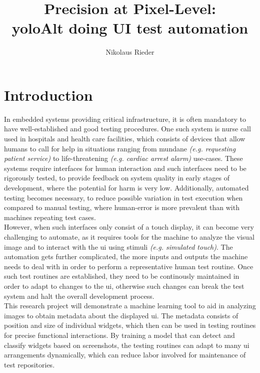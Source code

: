 \documentclass[Bachelor, BIC, english, fhCitStyle, IEEE]{BASE/twbook} %
\title{Precision at Pixel-Level:\\\acl{yoloAlt} doing UI test automation}
\author{Nikolaus Rieder}
\begin{document}
\maketitle
\chapter{Introduction}
In embedded systems providing critical infrastructure, it is often mandatory to have well-established and good testing procedures. One such system is nurse call used in hospitals and health care facilities, which consists of devices that allow humans to call for help in situations ranging from mundane \textit{(e.g. requesting patient service)} to life-threatening \textit{(e.g. cardiac arrest alarm)} use-cases. These systems require interfaces for human interaction and such interfaces need to be rigorously tested, to provide feedback on system quality in early stages of development, where the potential for harm is very low. Additionally, automated testing becomes necessary, to reduce possible variation in test execution when compared to manual testing, where human-error is more prevalent than with machines repeating test cases.\\
However, when such interfaces only consist of a touch display, it can become very challenging to automate, as it requires tools for the machine to analyze the visual image and to interact with the \ac{ui} using stimuli \textit{(e.g. simulated touch)}. The automation gets further complicated, the more inputs and outputs the machine needs to deal with in order to perform a representative human test routine. Once such test routines are established, they need to be continously maintained in order to adapt to changes to the \ac{ui}, otherwise such changes can break the test system and halt the overall development process.\\
This research project will demonstrate a machine learning tool to aid in analyzing images to obtain metadata about the displayed \ac{ui}. The metadata consists of position and size of individual widgets, which then can be used in testing routines for precise functional interactions. By training a model that can detect and classify widgets based on screenshots, the testing routines can adapt to many \ac{ui} arrangements dynamically, which can reduce labor involved for maintenance of test repositories.\\
\end{document}
